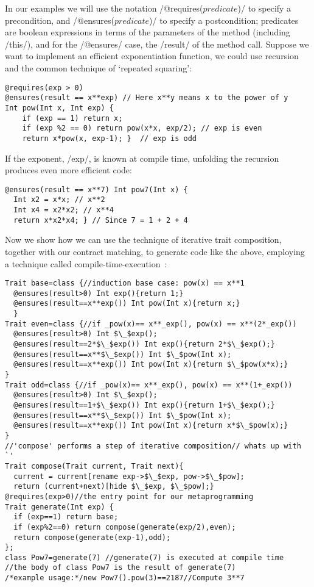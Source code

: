 In our examples we will use the notation /@requires($predicate$)/ 
to specify a precondition, and /@ensures($predicate$)/ 
to specify a postcondition; predicates are boolean expressions
in terms of the parameters of the method (including /this/), and for the /@ensures/ case, the /result/ of the method call.
Suppose we want to implement an efficient exponentiation function, we could use recursion and the common technique of `repeated squaring':
\vspace{-1ex}
\begin{lstlisting}
@requires(exp > 0)
@ensures(result == x**exp) // Here x**y means x to the power of y
Int pow(Int x, Int exp) {
	if (exp == 1) return x;
	if (exp %2 == 0) return pow(x*x, exp/2); // exp is even
	return x*pow(x, exp-1); }  // exp is odd
\end{lstlisting}
If the exponent, /exp/, is known at compile time,
unfolding the recursion produces even more efficient code:
\vspace{-1ex}
\begin{lstlisting}[firstnumber=7]
@ensures(result == x**7) Int pow7(Int x) { 
  Int x2 = x*x; // x**2
  Int x4 = x2*x2; // x**4
  return x*x2*x4; } // Since 7 = 1 + 2 + 4
\end{lstlisting}
Now we show how we can use the technique of iterative trait composition, together with our contract matching, to generate code like the above, employing a technique called compile-time-execution~\cite{sheard2002template}:
\vspace{-1ex}
\begin{lstlisting}[firstnumber=11]
Trait base=class {//induction base case: pow(x) == x**1
  @ensures(result>0) Int exp(){return 1;}  
  @ensures(result==x**exp()) Int pow(Int x){return x;}
  }
Trait even=class {//if _pow(x)== x**_exp(), pow(x) == x**(2*_exp())
  @ensures(result>0) Int $\_$exp();
  @ensures(result==2*$\_$exp()) Int exp(){return 2*$\_$exp();}
  @ensures(result==x**$\_$exp()) Int $\_$pow(Int x);
  @ensures(result==x**exp()) Int pow(Int x){return $\_$pow(x*x);}
}
Trait odd=class {//if _pow(x)== x**_exp(), pow(x) == x**(1+_exp())
  @ensures(result>0) Int $\_$exp();
  @ensures(result==1+$\_$exp()) Int exp(){return 1+$\_$exp();}
  @ensures(result==x**$\_$exp()) Int $\_$pow(Int x);
  @ensures(result==x**exp()) Int pow(Int x){return x*$\_$pow(x);}
}
//'compose' performs a step of iterative composition// whats up with `'
Trait compose(Trait current, Trait next){
  current = current[rename exp->$\_$exp, pow->$\_$pow];
  return (current+next)[hide $\_$exp, $\_$pow];}
@requires(exp>0)//the entry point for our metaprogramming
Trait generate(Int exp) {
  if (exp==1) return base;
  if (exp%2==0) return compose(generate(exp/2),even);
  return compose(generate(exp-1),odd);
};
class Pow7=generate(7) //generate(7) is executed at compile time
//the body of class Pow7 is the result of generate(7)
/*example usage:*/new Pow7().pow(3)==2187//Compute 3**7
\end{lstlisting}
